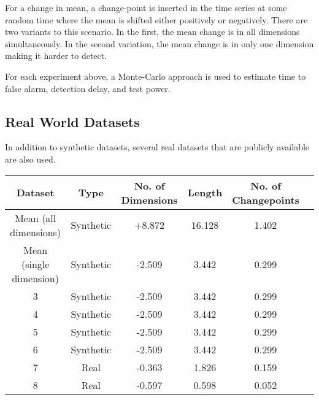 For a change in mean, a change-point is inserted in the time series at some random time where the mean is shifted either positively or negatively. There are two variants to this scenario. In the first, the mean change is in all dimensions simultaneously. In the second variation, the mean change is in only one dimension making it harder to detect. 

For each experiment above, a Monte-Carlo approach is used to estimate time to false alarm, detection delay, and test power. 

\subsection{Real World Datasets}
In addition to synthetic datasets, several real datasets that are publicly available are also used. 

\begin{tabular}{SSSSSS} \toprule
    {Dataset} & {Type} & {No. of Dimensions} & {Length} & {No. of Changepoints}  \\ \midrule
    {Mean (all dimensions)}  & {Synthetic} & +8.872 & 16.128 & 1.402  \\
    {Mean (single dimension)}  & {Synthetic}  & -2.509 & 3.442  & 0.299  \\
    3  & {Synthetic}  & -2.509 & 3.442  & 0.299  \\
    4 & {Synthetic}  & -2.509 & 3.442  & 0.299  \\
    5  & {Synthetic}  & -2.509 & 3.442  & 0.299  \\
    6  & {Synthetic}  & -2.509 & 3.442  & 0.299  \\
    7  & {Real}  & -0.363 & 1.826  & 0.159  \\
    8 & {Real}  & -0.597 & 0.598  & 0.052  \\ \bottomrule
\end{tabular}



